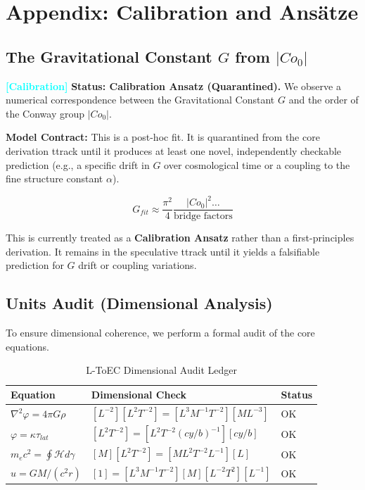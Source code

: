 \documentclass[11pt,titlepage]{article}
\newcommand{\tagcal}{\textcolor{cyan}{\textbf{[Calibration]}} }
\begin{document}
\section{Appendix: Calibration and Ansätze}
\label{sec:calibration}

\subsection{The Gravitational Constant $G$ from $|Co_0|$}
\tagcal \textbf{Status: Calibration Ansatz (Quarantined).} 
We observe a numerical correspondence between the Gravitational Constant $G$ and the order of the Conway group $|Co_0|$. 

\textbf{Model Contract:} This is a post-hoc fit. It is quarantined from the core derivation ttrack until it produces at least one novel, independently checkable prediction (e.g., a specific drift in $G$ over cosmological time or a coupling to the fine structure constant $\alpha$).

\begin{equation}
G_{fit} \approx \frac{\pi^2}{4} \frac{|Co_0|^2 \dots}{\text{bridge factors}}
\end{equation}

This is currently treated as a \textbf{Calibration Ansatz} rather than a first-principles derivation. It remains in the speculative ttrack until it yields a falsifiable prediction for $G$ drift or coupling variations.

\subsection{Units Audit (Dimensional Analysis)}
\label{sec:units_audit}
To ensure dimensional coherence, we perform a formal audit of the core equations.

\begin{table}[h!]
\centering
\begin{tabular}{@{}lll@{}}
\toprule
\textbf{Equation} & \textbf{Dimensional Check} & \textbf{Status} \\ \midrule
$\nabla^2 \varphi = 4\pi G \rho$ & $[L^{-2}][L^2 T^{-2}] = [L^3 M^{-1} T^{-2}][M L^{-3}]$ & OK \\
$\varphi = \kappa \tau_{lat}$ & $[L^2 T^{-2}] = [L^2 T^{-2} (cy/b)^{-1}][cy/b]$ & OK \\
$m_e c^2 = \oint \mathcal{H} d\gamma$ & $[M][L^2 T^{-2}] = [M L^2 T^{-2} L^{-1}][L]$ & OK \\
$u = GM/(c^2 r)$ & $[1] = [L^3 M^{-1} T^{-2}][M][L^{-2} T^2][L^{-1}]$ & OK \\ \bottomrule
\end{tabular}
\caption{L-ToEC Dimensional Audit Ledger}
\end{table}
\end{document}
